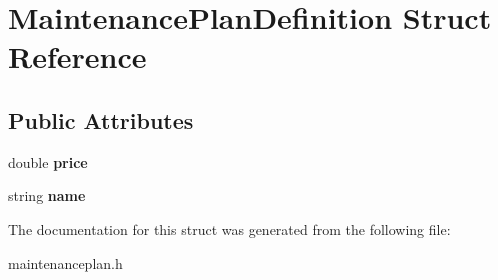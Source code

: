 \section{Maintenance\+Plan\+Definition Struct Reference}
\label{struct_maintenance_plan_definition}
\subsection*{Public Attributes}
\begin{DoxyCompactItemize}
\item 
\mbox{\label{struct_maintenance_plan_definition_aa7e602c72ca80996ee52e9edef541362}} 
double {\bfseries price}
\item 
\mbox{\label{struct_maintenance_plan_definition_ab33269a656ccf243769eafb05ced1cf5}} 
string {\bfseries name}
\end{DoxyCompactItemize}


The documentation for this struct was generated from the following file\+:\begin{DoxyCompactItemize}
\item 
maintenanceplan.\+h\end{DoxyCompactItemize}
